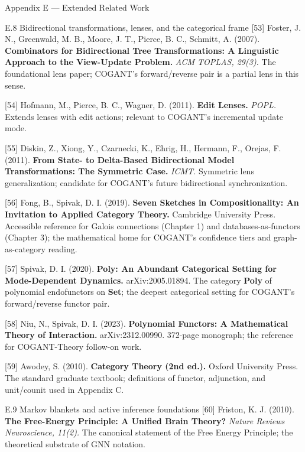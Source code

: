 \documentclass[
  ignorenonframetext,
]{beamer}
\begin{document}
\begin{frame}[fragile]{Appendix E --- Extended Related Work}
\begin{block}{E.8 Bidirectional transformations, lenses, and the
categorical frame}
\protect{}\label{e.8-bidirectional-transformations-lenses-and-the-categorical-frame}
{[}53{]} Foster, J. N., Greenwald, M. B., Moore, J. T., Pierce, B. C.,
Schmitt, A. (2007). \textbf{Combinators for Bidirectional Tree
Transformations: A Linguistic Approach to the View-Update Problem.}
\emph{ACM TOPLAS, 29(3).} The foundational lens paper; COGANT's
forward/reverse pair is a partial lens in this sense.

{[}54{]} Hofmann, M., Pierce, B. C., Wagner, D. (2011). \textbf{Edit
Lenses.} \emph{POPL.} Extends lenses with edit actions; relevant to
COGANT's incremental update mode.

{[}55{]} Diskin, Z., Xiong, Y., Czarnecki, K., Ehrig, H., Hermann, F.,
Orejas, F. (2011). \textbf{From State- to Delta-Based Bidirectional
Model Transformations: The Symmetric Case.} \emph{ICMT.} Symmetric lens
generalization; candidate for COGANT's future bidirectional
synchronization.

{[}56{]} Fong, B., Spivak, D. I. (2019). \textbf{Seven Sketches in
Compositionality: An Invitation to Applied Category Theory.} Cambridge
University Press. Accessible reference for Galois connections (Chapter
1) and databases-as-functors (Chapter 3); the mathematical home for
COGANT's confidence tiers and graph-as-category reading.

{[}57{]} Spivak, D. I. (2020). \textbf{Poly: An Abundant Categorical
Setting for Mode-Dependent Dynamics.} arXiv:2005.01894. The category
\textbf{Poly} of polynomial endofunctors on \textbf{Set}; the deepest
categorical setting for COGANT's forward/reverse functor pair.

{[}58{]} Niu, N., Spivak, D. I. (2023). \textbf{Polynomial Functors: A
Mathematical Theory of Interaction.} arXiv:2312.00990. 372-page
monograph; the reference for COGANT-Theory follow-on work.

{[}59{]} Awodey, S. (2010). \textbf{Category Theory (2nd ed.).} Oxford
University Press. The standard graduate textbook; definitions of
functor, adjunction, and unit/counit used in Appendix C.
\end{block}

\begin{block}{E.9 Markov blankets and active inference foundations}
\protect{}\label{e.9-markov-blankets-and-active-inference-foundations}
{[}60{]} Friston, K. J. (2010). \textbf{The Free-Energy Principle: A
Unified Brain Theory?} \emph{Nature Reviews Neuroscience, 11(2).} The
canonical statement of the Free Energy Principle; the theoretical
substrate of GNN notation.


\end{block}
\end{frame}
\end{document}

